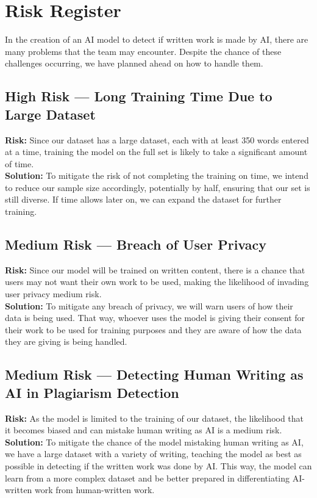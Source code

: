 \documentclass{article} %
\begin{document}
\section{Risk Register}
In the creation of an AI model to detect if written work is made by AI, there are many problems that the team may encounter. Despite the chance of these challenges occurring, we have planned ahead on how to handle them.

\subsection{High Risk — Long Training Time Due to Large Dataset}
\textbf{Risk:} Since our dataset has a large dataset, each with at least 350 words entered at a time, training the model on the full set is likely to take a significant amount of time.\\
\textbf{Solution:} To mitigate the risk of not completing the training on time, we intend to reduce our sample size accordingly, potentially by half, ensuring that our set is still diverse. If time allows later on, we can expand the dataset for further training. 

\subsection{Medium Risk — Breach of User Privacy}
\textbf{Risk:} Since our model will be trained on written content, there is a chance that users may not want their own work to be used, making the likelihood of invading user privacy medium risk.\\
\textbf{Solution:} To mitigate any breach of privacy, we will warn users of how their data is being used. That way, whoever uses the model is giving their consent for their work to be used for training purposes and they are aware of how the data they are giving is being handled.

\subsection{Medium Risk — Detecting Human Writing as AI in Plagiarism Detection}
\textbf{Risk:} As the model is limited to the training of our dataset, the likelihood that it becomes biased and can mistake human writing as AI is a medium risk. \\
\textbf{Solution:} To mitigate the chance of the model mistaking human writing as AI, we have a large dataset with a variety of writing, teaching the model as best as possible in detecting if the written work was done by AI. This way, the model can learn from a more complex dataset and be better prepared in differentiating AI-written work from human-written work.
\end{document}
